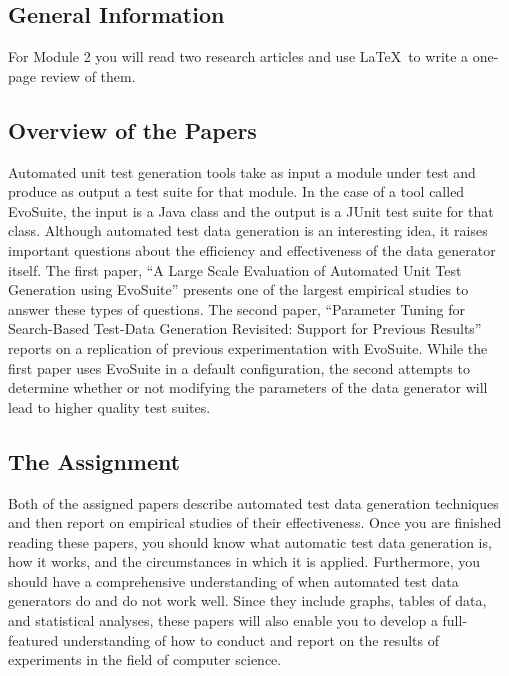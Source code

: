 
\usepackage[compact]{titlesec}




\subsection*{General Information}

For Module 2 you will read two research articles and use \LaTeX\ to write a one-page review of them.

\subsection*{Overview of the Papers}

  Automated unit test generation tools take as input a module under test and produce as output a test suite for that
  module. In the case of a tool called EvoSuite, the input is a Java class and the output is a JUnit test suite for that
  class. Although automated test data generation is an interesting idea, it raises important questions about the
  efficiency and effectiveness of the data generator itself. The first paper, ``A Large Scale Evaluation of Automated
  Unit Test Generation using EvoSuite'' presents one of the largest empirical studies to answer these types of
  questions. The second paper, ``Parameter Tuning for Search-Based Test-Data Generation Revisited: Support for Previous
  Results'' reports on a replication of previous experimentation with EvoSuite. While the first paper uses EvoSuite in a
  default configuration, the second attempts to determine whether or not modifying the parameters of the data generator
  will lead to higher quality test suites.

\subsection*{The Assignment}

  Both of the assigned papers describe automated test data generation techniques and then report on empirical studies of
  their effectiveness.  Once you are finished reading these papers, you should know what automatic test data generation
  is, how it works, and the circumstances in which it is applied.  Furthermore, you should have a comprehensive
  understanding of when automated test data generators do and do not work well.  Since they include graphs, tables of
  data, and statistical analyses, these papers will also enable you to develop a full-featured understanding of how to
  conduct and report on the results of experiments in the field of computer science.


